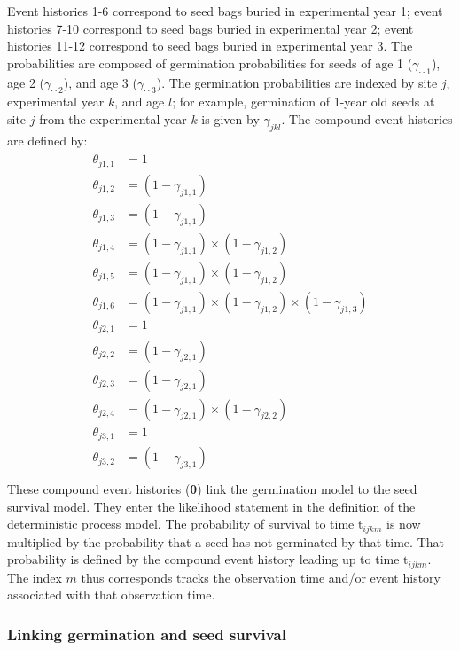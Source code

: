 \documentclass[12pt, oneside, titlepage]{article}   	%
\begin{document}
Event histories 1-6 correspond to seed bags buried in experimental year 1; event histories 7-10 correspond to seed bags buried in experimental year 2; event histories 11-12 correspond to seed bags buried in experimental year 3. The probabilities are composed of germination probabilities for seeds of age 1 ($\gamma_{\cdot \cdot 1}$), age 2 ($\gamma_{\cdot \cdot 2}$), and age 3 ($\gamma_{\cdot \cdot 3}$). The germination probabilities are indexed by site $j$, experimental year $k$, and age $l$; for example, germination of 1-year old seeds at site $j$ from the experimental year $k$ is given by $\gamma_{jkl}$. The compound event histories are defined by:
%
\singlespace
%
\begin{align}
  \begin{split}
\theta_{j1,1} & = 1 \\
\theta_{j1,2} & = (1-\gamma_{j1,1}) \\
\theta_{j1,3} & = (1-\gamma_{j1,1}) \\
\theta_{j1,4} & = (1-\gamma_{j1,1}) \times (1-\gamma_{j1,2}) \\
\theta_{j1,5} & = (1-\gamma_{j1,1}) \times (1-\gamma_{j1,2}) \\
\theta_{j1,6} & = (1-\gamma_{j1,1}) \times (1-\gamma_{j1,2}) \times (1-\gamma_{j1,3}) \\
\theta_{j2,1} & = 1 \\
\theta_{j2,2} & = (1-\gamma_{j2,1}) \\
\theta_{j2,3} & = (1-\gamma_{j2,1}) \\
\theta_{j2,4} & = (1-\gamma_{j2,1}) \times (1-\gamma_{j2,2}) \\
\theta_{j3,1} & = 1 \\
\theta_{j3,2} & = (1-\gamma_{j3,1}) \\
  \end{split}
\end{align}
%
\doublespace
%
These compound event histories ($\bm{\theta}$) link the germination model to the seed survival model. They enter the likelihood statement in the definition of the deterministic process model. The probability of survival to time $\mathrm{t}_{ijkm}$ is now multiplied by the probability that a seed has not germinated by that time. That probability is defined by the compound event history leading up to time $\mathrm{t}_{ijkm}$. The index $m$ thus corresponds tracks the observation time and/or event history associated with that observation time.

\subsubsection{Linking germination and seed survival}
\end{document}
